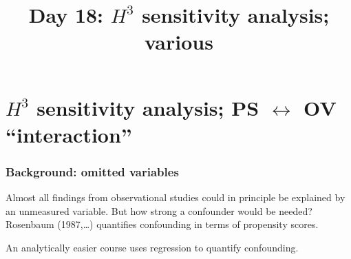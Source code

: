 %

%







\title[Day 18]{Day 18: $H^{3}$ sensitivity analysis; various}


\usepackage{xspace}
\newcommand{\satm}{\mbox{\textsc{sat-m}}\xspace}
\newcommand{\satv}{\mbox{\textsc{sat-v}}\xspace}
\newcommand{\upm}{\mbox{\textsc{urm}}\xspace}
\newcommand{\asian}{\mbox{\textsc{asian}}\xspace}
\newcommand{\presatm}{\mbox{\textsc{pre-m}}\xspace}
\newcommand{\premath}{\mbox{\textsc{pre-m}}\xspace}
\newcommand{\presatv}{\mbox{\textsc{pre-v}}\xspace}
\newcommand{\preverb}{\mbox{\textsc{pre-v}}\xspace}
\newcommand{\parentsinc}{\mbox{\textsc{incm}}\xspace}
\newcommand{\gpa}{\mbox{\textsc{gpa}}\xspace}
\newcommand{\dadsed}{\mbox{\textsc{dadsed}}\xspace}
\newcommand{\momsed}{\mbox{\textsc{momsed}}\xspace}
\newcommand{\avgeng}{\mbox{\textsc{e-gpa}}\xspace}
\newcommand{\avgmath}{\mbox{\textsc{m-gpa}}\xspace}
\newcommand{\avgnatsci}{\mbox{\textsc{ns-gpa}}\xspace}
\newcommand{\avgssci}{\mbox{\textsc{ss-gpa}}\xspace}
\newcommand{\coach}{\mbox{\textsc{coach}}\xspace}
\newcommand{\dadcoll}{\mbox{\textsc{dadcoll}}\xspace}
\newcommand{\aavg}{\mbox{\textsc{a-avg}}\xspace}





\section{$H^{3}$ sensitivity analysis; PS $\leftrightarrow$ OV ``interaction''}


\begin{frame}
  \frametitle{Background: omitted variables}
  
  Almost all findings from observational studies could in principle be
  explained by an unmeasured variable. But how strong a confounder
  would be needed?  Rosenbaum (1987,\ldots) quantifies confounding in
  terms of propensity scores.
  
  \begin{center}
\end{center}

  An analytically easier course uses regression to quantify confounding. 
\end{frame}

